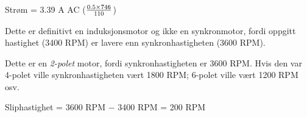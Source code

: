 Strøm = 3.39 A AC ($0.5 \times 746 \over 110$)

\vskip 10pt

Dette er definitivt en induksjonsmotor og ikke en synkronmotor, fordi oppgitt hastighet (3400 RPM) er lavere enn synkronhastigheten (3600 RPM).
 
\vskip 10pt

Dette er en {\it 2-polet} motor, fordi synkronhastigheten er 3600 RPM. Hvis den var 4-polet ville synkronhastigheten vært 1800 RPM; 6-polet ville vært 1200 RPM osv.

\vskip 10pt

Sliphastighet = 3600 RPM $-$ 3400 RPM = 200 RPM




